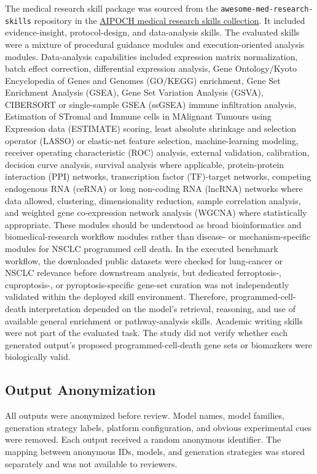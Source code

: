 \documentclass[11pt]{article}
\begin{document}
The medical research skill package was sourced from the \texttt{awesome-med-research-skills} repository in the \href{https://github.com/aipoch/medical-research-skills/tree/main/awesome-med-research-skills}{AIPOCH medical research skills collection}. It included evidence-insight, protocol-design, and data-analysis skills. The evaluated skills were a mixture of procedural guidance modules and execution-oriented analysis modules. Data-analysis capabilities included expression matrix normalization, batch effect correction, differential expression analysis, Gene Ontology/Kyoto Encyclopedia of Genes and Genomes (GO/KEGG) enrichment, Gene Set Enrichment Analysis (GSEA), Gene Set Variation Analysis (GSVA), CIBERSORT or single-sample GSEA (ssGSEA) immune infiltration analysis, Estimation of STromal and Immune cells in MAlignant Tumours using Expression data (ESTIMATE) scoring, least absolute shrinkage and selection operator (LASSO) or elastic-net feature selection, machine-learning modeling, receiver operating characteristic (ROC) analysis, external validation, calibration, decision curve analysis, survival analysis where applicable, protein-protein interaction (PPI) networks, transcription factor (TF)-target networks, competing endogenous RNA (ceRNA) or long non-coding RNA (lncRNA) networks where data allowed, clustering, dimensionality reduction, sample correlation analysis, and weighted gene co-expression network analysis (WGCNA) where statistically appropriate. These modules should be understood as broad bioinformatics and biomedical-research workflow modules rather than disease- or mechanism-specific modules for NSCLC programmed cell death. In the executed benchmark workflow, the downloaded public datasets were checked for lung-cancer or NSCLC relevance before downstream analysis, but dedicated ferroptosis-, cuproptosis-, or pyroptosis-specific gene-set curation was not independently validated within the deployed skill environment. Therefore, programmed-cell-death interpretation depended on the model's retrieval, reasoning, and use of available general enrichment or pathway-analysis skills. Academic writing skills were not part of the evaluated task. The study did not verify whether each generated output's proposed programmed-cell-death gene sets or biomarkers were biologically valid.

\subsection{Output Anonymization}

All outputs were anonymized before review. Model names, model families, generation strategy labels, platform configuration, and obvious experimental cues were removed. Each output received a random anonymous identifier. The mapping between anonymous IDs, models, and generation strategies was stored separately and was not available to reviewers.
\end{document}
